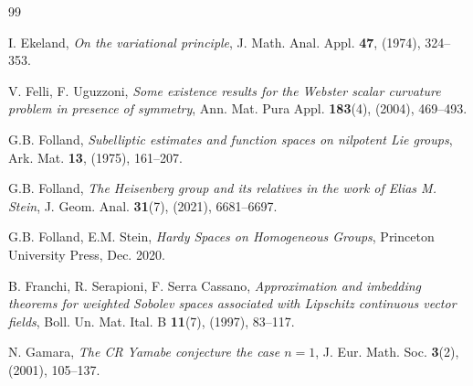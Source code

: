 \documentclass[11pt]{amsart}
\numberwithin{equation}{section} %
\theoremstyle{definition}
\begin{document}
\begin{thebibliography}{99}
	
	
	
	I. Ekeland,
	{\em On the variational principle},
	J. Math. Anal. Appl. {\bf 47}, (1974), 324--353.
	
	V. Felli, F. Uguzzoni, 
	{\em Some existence results for the Webster scalar curvature problem in presence of symmetry},
	Ann. Mat. Pura Appl. {\bf 183}(4), (2004), 469--493.
	
	
	G.B. Folland,
	{\em Subelliptic estimates and function spaces on nilpotent Lie groups}, 
	Ark. Mat. {\bf 13}, (1975), 161--207.
	
	G.B. Folland, 
		{\em The Heisenberg group and its relatives in the work of Elias M. Stein},
	J. Geom. Anal. {\bf 31}(7), (2021), 6681--6697.
	
	
	G.B. Folland, E.M. Stein,
	{\em Hardy {{Spaces}} on {{Homogeneous
				Groups}}}, Princeton University Press, Dec. 2020.
	
	B. Franchi, R. Serapioni, F. Serra Cassano, 
	{\em Approximation and imbedding theorems for weighted Sobolev spaces
		associated with Lipschitz continuous vector fields}, 
	Boll. Un. Mat. Ital. B {\bf 11}(7), (1997), 83--117.		
	
	
	N. Gamara, 
	{\em The CR Yamabe conjecture the case $n = 1$}, 
	J. Eur. Math. Soc. {\bf 3}(2), (2001), 105--137.
	

\end{thebibliography}
\end{document}
